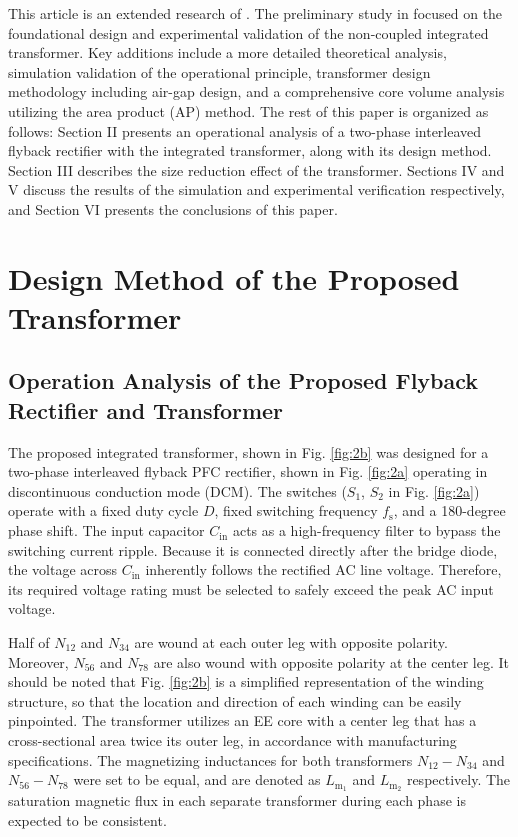 \documentclass[lettersize,journal]{IEEEtran}
\begin{document}
This article is an extended research of \cite{ECCE}. The preliminary study in \cite{ECCE} focused on the foundational design and experimental validation of the non-coupled integrated transformer. Key additions include a more detailed theoretical analysis, simulation validation of the operational principle, transformer design methodology including air-gap design, and a comprehensive core volume analysis utilizing the area product (AP) method. The rest of this paper is organized as follows: Section II presents an operational analysis of a two-phase interleaved flyback rectifier with the integrated transformer, along with its design method. Section III describes the size reduction effect of the transformer. Sections IV and V discuss the results of the simulation and experimental verification respectively, and Section VI presents the conclusions of this paper.

\section{Design Method of the Proposed Transformer}
\subsection{Operation Analysis of the Proposed Flyback Rectifier and Transformer}
The proposed integrated transformer, shown in Fig. \ref{fig:2b} was designed for a two-phase interleaved flyback PFC rectifier, shown in Fig. \ref{fig:2a} operating in discontinuous conduction mode (DCM). The switches ($S_1$, $S_2$ in Fig. \ref{fig:2a}) operate with a fixed duty cycle $D$, fixed switching frequency $f_\mathrm{s}$, and a 180-degree phase shift. The input capacitor $C_\mathrm{in}$ acts as a high-frequency filter to bypass the switching current ripple. Because it is connected directly after the bridge diode, the voltage across $C_\mathrm{in}$ inherently follows the rectified AC line voltage. Therefore, its required voltage rating must be selected to safely exceed the peak AC input voltage.

Half of $N_{12}$ and $N_{34}$ are wound at each outer leg with opposite polarity. Moreover, $N_{56}$ and $N_{78}$ are also wound with opposite polarity at the center leg. It should be noted that Fig. \ref{fig:2b} is a simplified representation of the winding structure, so that the location and direction of each winding can be easily pinpointed. The transformer utilizes an EE core with a center leg that has a cross-sectional area twice its outer leg, in accordance with manufacturing specifications. The magnetizing inductances for both transformers $N_{12}-N_{34}$ and $N_{56}-N_{78}$ were set to be equal, and are denoted as $L_{\mathrm{m}_1}$ and $L_{\mathrm{m}_2}$ respectively. The saturation magnetic flux in each separate transformer during each phase is expected to be consistent.
\end{document}
